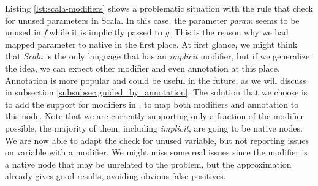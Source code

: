 \begin{enumerate}
	
	Listing \ref{lst:scala-modifiers} shows a problematic situation with the rule that check for unused parameters in Scala. In this case, the parameter \emph{param} seems to be unused in \emph{f} while it is implicitly passed to \emph{g}.
	This is the reason why we had mapped parameter to native in the first place.
	At first glance, we might think that \emph{Scala} is the only language that has an \emph{implicit} modifier, but if we generalize the idea, we can expect other modifier and even annotation at this place. 
	Annotation is more popular and could be useful in the future, as we will discuss in subsection \ref{subsubsec:guided_by_annotation}.
	The solution that we choose is to add the support for modifiers in \slang{}, to map both modifiers and annotation to this node.
	Note that we are currently supporting only a fraction of the modifier possible, the majority of them, including \emph{implicit}, are going to be native nodes.
	We are now able to adapt the check for unused variable, but not reporting issues on variable with a modifier. 
	We might miss some real issues since the modifier is a native node that may be unrelated to the problem, but the approximation already gives good results, avoiding obvious false positives.
\end{enumerate}

